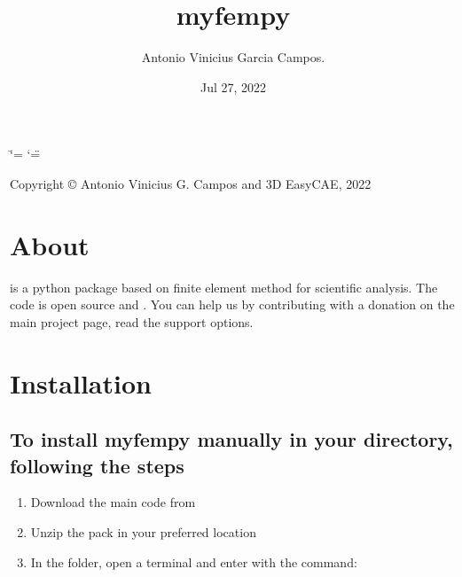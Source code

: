 \documentclass[letterpaper,10pt,english]{sphinxmanual}
\title{myfempy}
\date{Jul 27, 2022}
\author{Antonio Vinicius Garcia Campos.\@{}}
\begin{document}
\ifdefined\shorthandoff
  \ifnum\catcode`\=\string=\active\shorthandoff{=}\fi
  \ifnum\catcode`\"=\active{}\fi
\fi

\pagestyle{empty}
\sphinxmaketitle
\pagestyle{plain}
\sphinxtableofcontents
\pagestyle{normal}
\label{\detokenize{index::doc}}
\sphinxAtStartPar
{}

\begin{figure}[htbp]
\centering

\noindent{}
\end{figure}



\sphinxAtStartPar
Copyright © Antonio Vinicius G. Campos and 3D EasyCAE, 2022


\chapter{About}
\label{\detokenize{index:about}}
\sphinxAtStartPar
{} is a python package based on finite element method for
scientific analysis. The code is open source and . You can help us by contributing with a donation on the main
project page, read the support options. 


\chapter{Installation}
\label{\detokenize{index:installation}}

\section{To install myfempy manually in your directory, following the steps}
\label{\detokenize{index:to-install-myfempy-manually-in-your-directory-following-the-steps}}\begin{enumerate}
%
\item {} 
\sphinxAtStartPar
Download the main code from

\item {} 
\sphinxAtStartPar
Unzip the pack in your preferred location

\item {} 
\sphinxAtStartPar
In the  folder, open a terminal and enter with the
command:

\end{enumerate}
\end{document}
